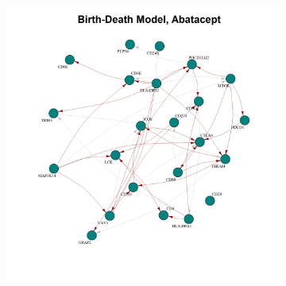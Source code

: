 \documentclass{report}
\begin{document}
\begin{figure}[!ht]
{\begin{minipage}{\textwidth}
\begin{subfigure}[b]{0.45\textwidth}
					\label{fig:net_ad_treat}
				\end{subfigure}
				\hspace{0.35cm}
				\begin{subfigure}[b]{0.45\textwidth}   
					\centering
					\includegraphics[width=\textwidth, height=12cm]{Figures/Application/analysis/net_BD_treat.png}
					\label{fig:net_BD_treat}
				\end{subfigure}
				
				\vspace{0.4cm}   %
				

\end{minipage}}
\end{figure}
\end{document}
